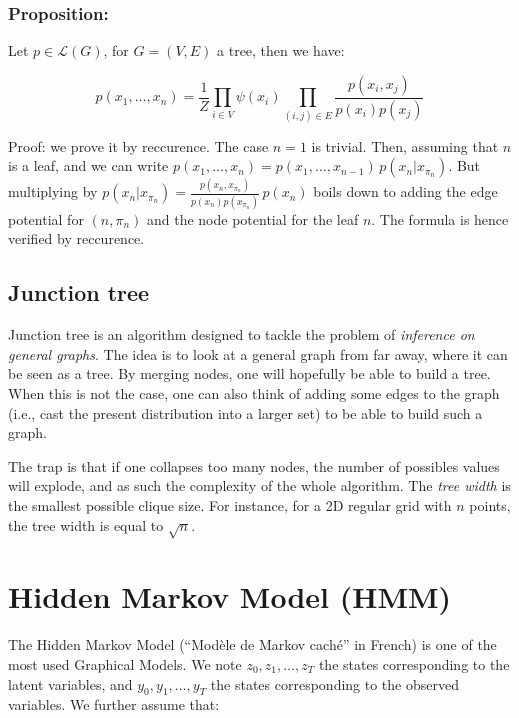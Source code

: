 \documentclass[12pt,a4paper]{report}
\begin{document}
\subsubsection{Proposition:}

Let $p\in \mathcal{L}(G)$, for $G = (V,E)$ a tree, then we have:

\begin{equation}
p(x_1,\dots,x_n)= \frac{1}{Z}\prod_{i\in V}\psi(x_i)\prod_{(i,j)\in E}\frac{p(x_i,x_j)}{p(x_i)p(x_j)}
\end{equation}

Proof: we prove it by reccurence. The case $n=1$ is trivial. Then, assuming that $n$ is a leaf, and we can write $p(x_1,\ldots, x_n)=p(x_1,\ldots, x_{n-1}) \, p(x_n|x_{\pi_n})$.
But multiplying by $p(x_n|x_{\pi_n})=\frac{p(x_n,x_{\pi_n})}{p(x_n)p(x_{\pi_n})} \, p(x_n)$ boils down to adding the edge potential for $(n, \pi_n)$ and the node potential for the leaf $n$.
The formula is hence verified by reccurence.
\subsection{Junction tree}
Junction tree is an algorithm designed to tackle the problem of \textit{inference on general graphs}. The idea is to look at a general graph from far away, where it can be seen as a tree. By merging nodes, one will hopefully be able to build a tree. When this is not the case, one can also think of adding some edges to the graph (i.e., cast the present distribution into a larger set) to be able to build such a graph.

The trap is that if one collapses too many nodes, the number of possibles values will explode, and as such the complexity of the whole algorithm. The \textit{tree width} is the smallest possible clique size. For instance, for a 2D regular grid with $n$ points, the tree width is equal to $\sqrt{n}$.


\section{Hidden Markov Model (HMM)}

The Hidden Markov Model (``Mod\`ele de Markov cach\'e'' in French) is one of the most used Graphical Models. We note $z_0, z_1, \ldots, z_T$ the states corresponding to the latent variables, and $y_0,y_1, \ldots, y_T$ the states corresponding to the observed variables. We further assume that:

\end{document}
